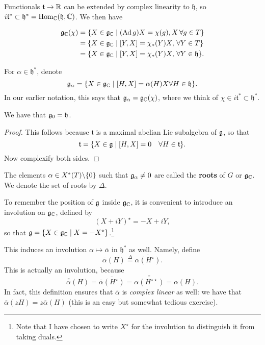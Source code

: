 \documentclass[11pt, english]{article}
\begin{document}
Functionals $\mathfrak t \to \mathbb{R}$ can be extended by complex linearity to $\mathfrak h$, so $i \mathfrak t^\ast \subset \mathfrak h^\ast = \operatorname{Hom}_{\mathbb{C}}(\mathfrak h, \mathbb{C})$. We then have

\begin{align*}
  \mathfrak g_{\mathbb{C}}(\chi) &= \{ X \in \mathfrak g_{\mathbb{C}} \mid (\operatorname{Ad} g)X = \chi(g), X\, \forall g \in T \} \\
&= \{ X \in \mathfrak g_{\mathbb{C}} \mid [Y,X] = \chi_\ast(Y)X, \,\forall Y \in T \} \\
&= \{ X \in \mathfrak g_{\mathbb{C}} \mid [Y,X] = \chi_\ast(Y)X, \, \forall Y \in \mathfrak h \}.
\end{align*}

For $\alpha \in \mathfrak h^\ast$, denote
$$
\mathfrak g_\alpha = \{ X \in \mathfrak g_{\mathbb{C}} \mid [H,X] = \alpha(H)X \forall H \in \mathfrak h \}.
$$
In our earlier notation, this says that $\mathfrak g_{\alpha} = \mathfrak g_{\mathbb{C}}(\chi)$, where we think of $\chi \in i \mathfrak t^\ast \subset \mathfrak h^\ast$.

\begin{lemma}
We have that $\mathfrak g_0 = \mathfrak h$.
\end{lemma}
\begin{proof}
 This follows because $\mathfrak t$ is a maximal abelian Lie subalgebra of $\mathfrak g$, so that
$$
\mathfrak t = \{ X \in \mathfrak g \mid [H,X] = 0 \quad \forall H \in \mathfrak t \}.
$$
Now complexify both sides.
\end{proof}

The elements $\alpha \in X^\ast(T) \backslash \{ 0 \}$ such that $\mathfrak g_\alpha \neq 0$ are called the \textbf{roots} of $G$ or $\mathfrak g_{\mathbb{C}}$. We denote the set of roots by $\Delta$. 

To remember the position of $\mathfrak g$ inside $\mathfrak g_{\mathbb{C}}$, it is convenient to introduce an involution on $\mathfrak g_{\mathbb{C}}$, defined by
$$
(X+iY)^\star = -X + iY,
$$
so that $\mathfrak g = \{ X \in \mathfrak g_{\mathbb{C}} \mid X = -X^\star \}$.\footnote{Note that I have chosen to write $X^\star$ for the involution to distinguish it from taking duals.}

This induces an involution $\alpha \mapsto \overline \alpha$ in $\mathfrak h^\ast$ as well. Namely, define
$$
\overline \alpha(H) \stackrel{\Delta}{=} \overline{\alpha(H^\star)}.
$$
This is actually an involution, because
$$
\overline{\overline \alpha}(H) = \overline{\overline \alpha(H^\star)} = \overline{\overline{\alpha(H^{\star \star})}} = \alpha(H).
$$
In fact, this definition ensures that $\overline{\alpha}$ is \emph{complex linear} as well: we have that $\overline \alpha (zH) = z \overline \alpha(H)$ (this is an easy but somewhat tedious exercise).
\end{document}
